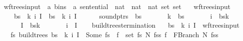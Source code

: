 \begin{isabellebody}
\isanewline
{}\isamarkupfalse%
\ wf{\isacharunderscore}{\kern0pt}trees{\isacharunderscore}{\kern0pt}input\ {\isacharcolon}{\kern0pt}{\isacharcolon}{\kern0pt}\ {\isachardoublequoteopen}{\isacharparenleft}{\kern0pt}{\isacharprime}{\kern0pt}a\ bins\ {\isasymtimes}\ {\isacharprime}{\kern0pt}a\ sentential\ {\isasymtimes}\ nat\ {\isasymtimes}\ nat\ {\isasymtimes}\ nat\ set{\isacharparenright}{\kern0pt}\ set{\isachardoublequoteclose}\ \isanewline
\ \ {\isachardoublequoteopen}wf{\isacharunderscore}{\kern0pt}trees{\isacharunderscore}{\kern0pt}input\ {\isacharequal}{\kern0pt}\ {\isacharbraceleft}{\kern0pt}\isanewline
\ \ \ \ {\isacharparenleft}{\kern0pt}bs{\isacharcomma}{\kern0pt}\ {\isasymomega}{\isacharcomma}{\kern0pt}\ k{\isacharcomma}{\kern0pt}\ i{\isacharcomma}{\kern0pt}\ I{\isacharparenright}{\kern0pt}\ {\isacharbar}{\kern0pt}\ bs\ {\isasymomega}\ k\ i\ I{\isachardot}{\kern0pt}\isanewline
\ \ \ \ \ \ sound{\isacharunderscore}{\kern0pt}ptrs\ {\isasymomega}\ bs\ {\isasymand}\isanewline
\ \ \ \ \ \ k\ {\isacharless}{\kern0pt}\ {\isacharbar}{\kern0pt}bs{\isacharbar}{\kern0pt}\ {\isasymand}\isanewline
\ \ \ \ \ \ i\ {\isacharless}{\kern0pt}\ {\isacharbar}{\kern0pt}bs{\isacharbang}{\kern0pt}k{\isacharbar}{\kern0pt}\ {\isasymand}\isanewline
\ \ \ \ \ \ I\ {\isasymsubseteq}\ {\isacharbraceleft}{\kern0pt}{}{\isachardot}{\kern0pt}{\isachardot}{\kern0pt}{\isacharless}{\kern0pt}{\isacharbar}{\kern0pt}bs{\isacharbang}{\kern0pt}k{\isacharbar}{\kern0pt}{\isacharbraceright}{\kern0pt}\ {\isasymand}\isanewline
\ \ \ \ \ \ i\ {\isasymin}\ I\isanewline
\ \ {\isacharbraceright}{\kern0pt}{\isachardoublequoteclose}\isanewline
\isanewline
{}\isamarkupfalse%
\ build{\isacharunderscore}{\kern0pt}trees{\isacharprime}{\kern0pt}{\isacharunderscore}{\kern0pt}termination{\isacharcolon}{\kern0pt}\isanewline
\ \ \ {\isachardoublequoteopen}{\isacharparenleft}{\kern0pt}bs{\isacharcomma}{\kern0pt}\ {\isasymomega}{\isacharcomma}{\kern0pt}\ k{\isacharcomma}{\kern0pt}\ i{\isacharcomma}{\kern0pt}\ I{\isacharparenright}{\kern0pt}\ {\isasymin}\ wf{\isacharunderscore}{\kern0pt}trees{\isacharunderscore}{\kern0pt}input{\isachardoublequoteclose}\isanewline
\ \ \ {\isachardoublequoteopen}{\isasymexists}fs{\isachardot}{\kern0pt}\ build{\isacharunderscore}{\kern0pt}trees{\isacharprime}{\kern0pt}\ bs\ {\isasymomega}\ k\ i\ I\ {\isacharequal}{\kern0pt}\ Some\ fs\ {\isasymand}\ {\isacharparenleft}{\kern0pt}{\isasymforall}f\ {\isasymin}\ set\ fs{\isachardot}{\kern0pt}\ {\isasymexists}N\ fss{\isachardot}{\kern0pt}\ f\ {\isacharequal}{\kern0pt}\ FBranch\ N\ fss{\isacharparenright}{\kern0pt}{\isachardoublequoteclose}%

\end{isabellebody}
